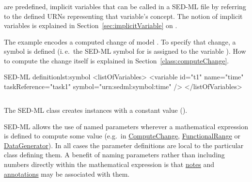 \subsubsection{}
\label{sec:symbol}
 are predefined, implicit variables that can be called in a SED-ML file by referring to the defined URNs representing that variable's concept. The notion of implicit variables is explained in Section~\ref{sec:implicitVariable} on .

The example encodes a computed change of model . To specify that change, a symbol is defined (i.\,e.\  the SED-ML symbol for  is assigned to the variable ). How to compute the change itself is explained in Section~\ref{class:computeChange}.

\begin{myXmlLst}{SED-ML  definition}{lst:symbol}
<listOfVariables>
	<variable id="t1" name="time" taskReference="task1" symbol="urn:sedml:symbol:time" />
</listOfVariables>
\end{myXmlLst}


\subsection{}
\label{class:parameter}
The SED-ML  class creates instances with a constant value ().


SED-ML allows the use of named parameters wherever a mathematical expression is defined to compute some value (e.g.\ in \hyperref[class:computeChange]{ComputeChange}, \hyperref[class:functionalRange]{FunctionalRange} or \hyperref[class:dataGenerator]{DataGenerator}). In all cases the parameter definitions are local to the particular class defining them. A benefit of naming parameters rather than including numbers directly within the mathematical expression is that \hyperref[class:notes]{notes} and \hyperref[class:annotation]{annotations} may be associated with them.


